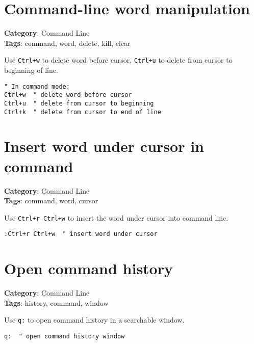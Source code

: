 {{{\section{Command-line word manipulation}

\textbf{Category}: Command Line\\ \textbf{Tags}: command, word, delete, kill, clear
\vspace{0.5cm}

Use {\footnotesize \Verb§Ctrl+w§} to delete word before cursor, {\footnotesize \Verb§Ctrl+u§} to delete from cursor to beginning of line.

\begin{Exa*}{}
\begin{Verbatim}[fontsize=\footnotesize, breaklines, breakanywhere]
" In command mode:
Ctrl+w  " delete word before cursor
Ctrl+u  " delete from cursor to beginning
Ctrl+k  " delete from cursor to end of line
\end{Verbatim}
\end{Exa*}

\section{Insert word under cursor in command}

\textbf{Category}: Command Line\\ \textbf{Tags}: command, word, cursor
\vspace{0.5cm}

Use {\footnotesize \Verb§Ctrl+r Ctrl+w§} to insert the word under cursor into command line.

\begin{Exa*}{}
\begin{Verbatim}[fontsize=\footnotesize, breaklines, breakanywhere]
:Ctrl+r Ctrl+w  " insert word under cursor
\end{Verbatim}
\end{Exa*}

\section{Open command history}

\textbf{Category}: Command Line\\ \textbf{Tags}: history, command, window
\vspace{0.5cm}

Use {\footnotesize \Verb§q:§} to open command history in a searchable window.

\begin{Exa*}{}
\begin{Verbatim}[fontsize=\footnotesize, breaklines, breakanywhere]
q:  " open command history window
\end{Verbatim}
\end{Exa*}

}}}
